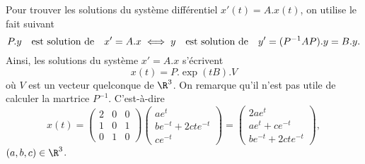{\begin{enumerate}
{Pour trouver les solutions du système différentiel $x'(t)=A.x(t)$, on utilise le fait suivant
$$P.y\quad{\hbox{est solution de}}\quad x'=A.x\iff y\quad{\hbox{est solution de}}\quad y'=(P^{-1}AP).y=B.y.$$
Ainsi, les solutions du système $x'=A.x$ s'écrivent
$$x(t)=P.\exp(tB).V$$
où $V$ est un vecteur quelconque de $\R^3$. On remarque qu'il n'est pas utile de calculer la martrice $P^{-1}$. C'est-à-dire
$$x(t)=\begin{pmatrix}2 & 0 & 0 \\  1&0&1 \\ 0&1&0\end{pmatrix}\begin{pmatrix}ae^t  \\  be^{-t}+2cte^{-t} \\  ce^{-t}\end{pmatrix}=\begin{pmatrix}2ae^t  \\  ae^{t}+ce^{-t} \\  be^{-t}+2cte^{-t}\end{pmatrix},$$
$(a,b,c)\in\R^3$.}
\end{enumerate}
}
